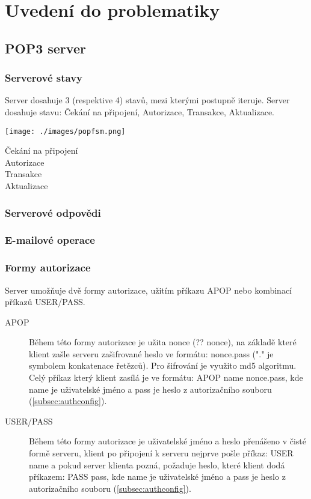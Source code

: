 \documentclass[11pt,a4paper]{report}
\begin{document}
    \clearpage
    \section{Uvedení do problematiky}
    \subsection{POP3 server}
    \label{subsec:pop3server}
    \subsubsection{Serverové stavy}
    Server dosahuje 3 (respektive 4) stavů, mezi kterými postupně iteruje. Server dosahuje stavu: Čekání na připojení, Autorizace, Transakce, Aktualizace.
    \begin{center}
        \texttt{[image: ./images/popfsm.png]}
    \end{center}
    \begin{description}
        \item [Čekání na připojení]
        \item [Autorizace]
        \item [Transakce]
        \item [Aktualizace]
    \end{description}
    \label{subsec:serverstatus}
    \subsubsection{Serverové odpovědi}
    \label{subsec:commresponse}
    \subsubsection{E-mailové operace}
    \label{subsec:mailoperations}
    \subsubsection{Formy autorizace}
    \label{subsec:authmethods}
    Server umožňuje dvě formy autorizace, užitím příkazu APOP nebo kombinací příkazů USER/PASS.
    \begin{description}
        \item [APOP] Během této formy autorizace je užita nonce (?? nonce), na základě které klient zašle serveru zašifrované heslo ve formátu: nonce.pass ("." je symbolem konkatenace řetězců). Pro šifrování je využito md5 algoritmu. Celý příkaz který klient zasílá je ve formátu: APOP name nonce.pass, kde name je uživatelské jméno a pass je heslo z autorizačního souboru (\ref{subsec:authconfig}).
        \item [USER/PASS] Během této formy autorizace je uživatelské jméno a heslo přenášeno v čisté formě serveru, klient po připojení k serveru nejprve pošle příkaz: USER name a pokud server klienta pozná, požaduje heslo, které klient dodá příkazem: PASS pass, kde name je uživatelské jméno a pass je heslo z autorizačního souboru (\ref{subsec:authconfig}).
    \end{description}
\end{document}
